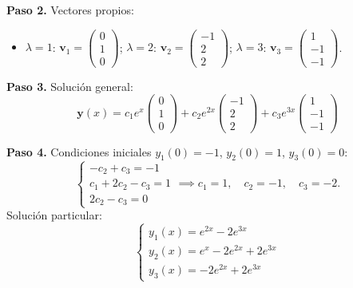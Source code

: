 \begin{prob}
\begin{enumerate}[$(a)$]
\begin{myproof}
\textbf{Paso 2.} Vectores propios:
\begin{itemize}
  \item $\lambda=1$: $\mathbf{v}_1 = \begin{pmatrix} 0 \\ 1 \\ 0 \end{pmatrix}$; \quad $\lambda=2$: $\mathbf{v}_2 = \begin{pmatrix} -1 \\ 2 \\ 2 \end{pmatrix}$; \quad $\lambda=3$: $\mathbf{v}_3 = \begin{pmatrix} 1 \\ -1 \\ -1 \end{pmatrix}$.
\end{itemize}

\textbf{Paso 3.} Solución general:
\[
\mathbf{y}(x) = c_1 e^{x} \begin{pmatrix} 0 \\ 1 \\ 0 \end{pmatrix} + c_2 e^{2x} \begin{pmatrix} -1 \\ 2 \\ 2 \end{pmatrix} + c_3 e^{3x} \begin{pmatrix} 1 \\ -1 \\ -1 \end{pmatrix}
\]

\textbf{Paso 4.} Condiciones iniciales $y_1(0)=-1$, $y_2(0)=1$, $y_3(0)=0$:
\[
\begin{cases}
-c_2 + c_3 = -1 \\
c_1 + 2c_2 - c_3 = 1 \\
2c_2 - c_3 = 0
\end{cases}
\implies c_1=1,\quad c_2=-1,\quad c_3=-2.
\]
Solución particular:
\[
\boxed{
\begin{cases}
y_1(x) = e^{2x} - 2e^{3x} \\[4pt]
y_2(x) = e^{x} - 2e^{2x} + 2e^{3x} \\[4pt]
y_3(x) = -2e^{2x} + 2e^{3x}
\end{cases}
}
\]
\end{myproof}
\end{enumerate}
\end{prob}


